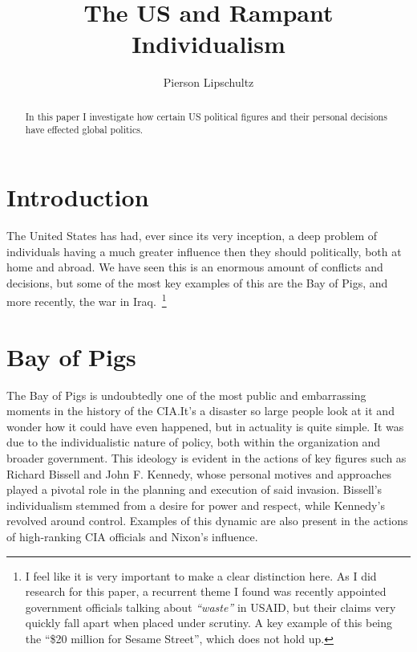 \documentclass{article}
\title{The US and Rampant Individualism }
\author{Pierson Lipschultz}
\begin{document}
\maketitle

\begin{abstract}
    In this paper I investigate how certain US political figures and their personal decisions have effected global politics.  
\end{abstract}


\section{Introduction}
    The United States has had, ever since its very inception, a deep problem of individuals having a much greater influence then they should politically, both at home and abroad. We have seen this is an enormous amount of conflicts and decisions, but some of the most key examples of this are the Bay of Pigs, and more recently, the war in Iraq.~\footnote{I feel like it is very important to make a clear distinction here. As I did research for this paper, a recurrent  theme I found was recently appointed government officials talking about \textit{``waste''} in USAID, but their claims very quickly fall apart when placed under scrutiny. A key example of this being the ``\$20 million for Sesame Street'', which does not hold up.}

\section{Bay of Pigs}

    The Bay of Pigs is undoubtedly one of the most public and embarrassing moments in the history of the CIA.\@ It's a disaster so large people look at it and wonder how it could have even happened, but in actuality is quite simple. It was due to the individualistic nature of policy, both within the organization and broader government. This ideology is evident in the actions of key figures such as Richard Bissell and John F. Kennedy, whose personal motives and approaches played a pivotal role in the planning and execution of said invasion. Bissell's individualism stemmed from a desire for power and respect, while Kennedy's revolved around control. Examples of this dynamic are also present in the actions of high-ranking CIA officials and Nixon's influence.~\parencite{JeffreysJones2003}
\end{document}
